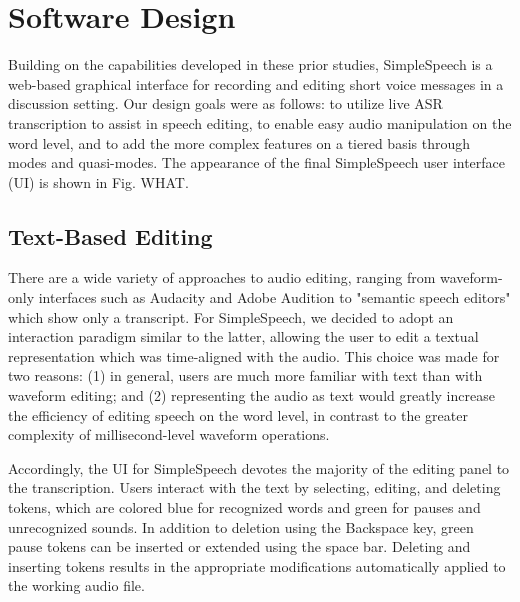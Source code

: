 \section{Software Design}
Building on the capabilities developed in these prior studies, SimpleSpeech is a web-based graphical interface for recording and editing short voice messages in a discussion setting.
Our design goals were as follows: to utilize live ASR transcription to assist in speech editing, to enable easy audio manipulation on the word level, and to add the more complex features on a tiered basis through modes and quasi-modes.
The appearance of the final SimpleSpeech user interface (UI) is shown in Fig. WHAT.

\subsection{Text-Based Editing}
There are a wide variety of approaches to audio editing, ranging from waveform-only interfaces such as Audacity and Adobe Audition to "semantic speech editors" \cite{whittaker_semantic} which show only a transcript. 
For SimpleSpeech, we decided to adopt an interaction paradigm similar to the latter, allowing the user to edit a textual representation which was time-aligned with the audio.
This choice was made for two reasons: (1) in general, users are much more familiar with text than with waveform editing; and (2) representing the audio as text would greatly increase the efficiency of editing speech on the word level, in contrast to the greater complexity of millisecond-level waveform operations. 

Accordingly, the UI for SimpleSpeech devotes the majority of the editing panel to the transcription. 
Users interact with the text by selecting, editing, and deleting tokens, which are colored blue for recognized words and green for pauses and unrecognized sounds. 
In addition to deletion using the Backspace key, green pause tokens can be inserted or extended using the space bar.
Deleting and inserting tokens results in the appropriate modifications automatically applied to the working audio file.

